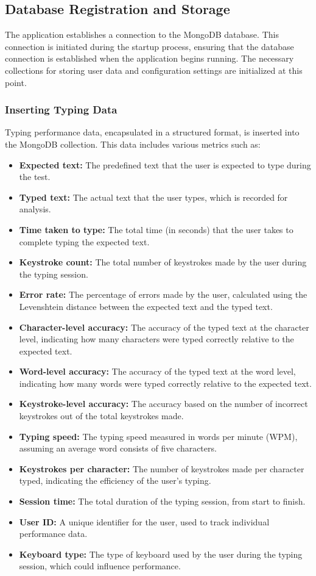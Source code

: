 \subsection{Database Registration and Storage}
The application establishes a connection to the MongoDB database. This connection is initiated during the startup process, ensuring that the database connection is established when the application begins running. The necessary collections for storing user data and configuration settings are initialized at this point.

\subsubsection{Inserting Typing Data}
Typing performance data, encapsulated in a structured format, is inserted into the MongoDB collection. This data includes various metrics such as:
\begin{itemize}
    \item \textbf{Expected text:} The predefined text that the user is expected to type during the test.
    \item \textbf{Typed text:} The actual text that the user types, which is recorded for analysis.
    \item \textbf{Time taken to type:} The total time (in seconds) that the user takes to complete typing the expected text.
    \item \textbf{Keystroke count:} The total number of keystrokes made by the user during the typing session.
    \item \textbf{Error rate:} The percentage of errors made by the user, calculated using the Levenshtein distance between the expected text and the typed text.
    \item \textbf{Character-level accuracy:} The accuracy of the typed text at the character level, indicating how many characters were typed correctly relative to the expected text.
    \item \textbf{Word-level accuracy:} The accuracy of the typed text at the word level, indicating how many words were typed correctly relative to the expected text.
    \item \textbf{Keystroke-level accuracy:} The accuracy based on the number of incorrect keystrokes out of the total keystrokes made.
    \item \textbf{Typing speed:} The typing speed measured in words per minute (WPM), assuming an average word consists of five characters.
    \item \textbf{Keystrokes per character:} The number of keystrokes made per character typed, indicating the efficiency of the user's typing.
    \item \textbf{Session time:} The total duration of the typing session, from start to finish.
    \item \textbf{User ID:} A unique identifier for the user, used to track individual performance data.
    \item \textbf{Keyboard type:} The type of keyboard used by the user during the typing session, which could influence performance.
\end{itemize}

